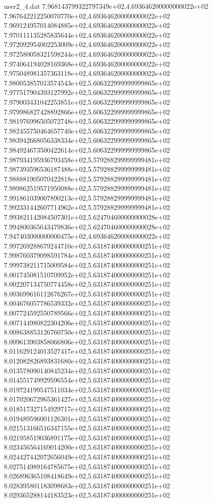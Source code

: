 \begin{filecontents}{user2_4.dat}
7.968143799322797349e+02,4.693646200000000022e+02
7.967642212250070770e+02,4.693646200000000022e+02
7.969124957014084885e+02,4.693646200000000022e+02
7.970111135285835644e+02,4.693646200000000022e+02
7.972092954002253009e+02,4.693646200000000022e+02
7.972580058321598244e+02,4.693646200000000022e+02
7.974064194028169368e+02,4.693646200000000022e+02
7.975048981357363118e+02,4.693646200000000022e+02
7.980053857013574543e+02,5.606322999999999865e+02
7.977517904393127992e+02,5.606322999999999865e+02
7.979003431042253851e+02,5.606322999999999865e+02
7.979986827428892866e+02,5.606322999999999865e+02
7.981976996505072748e+02,5.606322999999999865e+02
7.982455750464657740e+02,5.606322999999999865e+02
7.983942668056338334e+02,5.606322999999999865e+02
7.984924673500422614e+02,5.606322999999999865e+02
7.987934195936793458e+02,5.579288299999999481e+02
7.987393596536187488e+02,5.579288299999999481e+02
7.988881905070422818e+02,5.579288299999999481e+02
7.989862519571950088e+02,5.579288299999999481e+02
7.991861039007890213e+02,5.579288299999999481e+02
7.992331442607714962e+02,5.579288299999999481e+02
7.993821142084507301e+02,5.624704600000000028e+02
7.994800365643479836e+02,5.624704600000000028e+02
7.947403000000000475e+02,4.693646200000000022e+02
7.997269288679244710e+02,5.631874000000000251e+02
7.998760379098591784e+02,5.631874000000000251e+02
7.999738211715009584e+02,5.631874000000000251e+02
8.001745081510709952e+02,5.631874000000000251e+02
8.002207134750774458e+02,5.631874000000000251e+02
8.003699616112676267e+02,5.631874000000000251e+02
8.004676057786539332e+02,5.631874000000000251e+02
8.007724592550789566e+02,5.631874000000000251e+02
8.007144980822304206e+02,5.631874000000000251e+02
8.008638853126760750e+02,5.631874000000000251e+02
8.009613903858066806e+02,5.631874000000000251e+02
8.011629124013527417e+02,5.631874000000000251e+02
8.012082826893831680e+02,5.631874000000000251e+02
8.013578090140845234e+02,5.631874000000000251e+02
8.014551749929596554e+02,5.631874000000000251e+02
8.019724199547511034e+02,5.631874000000000251e+02
8.017020672965361427e+02,5.631874000000000251e+02
8.018517327154929717e+02,5.631874000000000251e+02
8.019489596001126301e+02,5.631874000000000251e+02
8.021513166516347155e+02,5.631874000000000251e+02
8.021958519036891175e+02,5.631874000000000251e+02
8.023456564169014200e+02,5.631874000000000251e+02
8.024427442072656049e+02,5.631874000000000251e+02
8.027514989164785675e+02,5.631874000000000251e+02
8.026896365108418649e+02,5.631874000000000251e+02
8.028395801183098683e+02,5.631874000000000251e+02
8.029365288144183523e+02,5.631874000000000251e+02

\end{filecontents}
